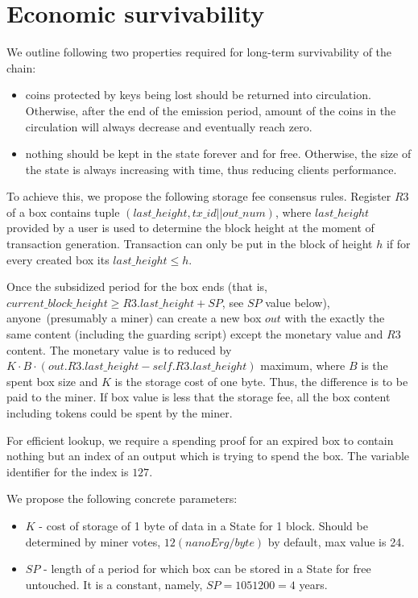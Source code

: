 \section{Economic survivability}

We outline following two properties required for long-term survivability of the chain:

\begin{itemize}
    \item{} coins protected by keys being lost should be returned into circulation.
    Otherwise, after the end of the emission period, amount of the coins
    in the circulation will always decrease and eventually reach zero.
    \item{} nothing should be kept in the state forever and for free.
    Otherwise, the size of the state is always increasing with time, thus reducing clients performance.
\end{itemize}

To achieve this, we propose the following storage fee consensus rules.
Register $R3$ of a box contains tuple $(last\_height, tx\_id || out\_num)$, where $last\_height$ provided by a user
is used to determine the block height at the moment of transaction generation.
Transaction can only be put in the block of height $h$ if for every created box its $last\_height \le h$.

Once the subsidized period for the box ends (that is,
$current\_block\_height \ge R3.last\_height + SP$, see $SP$ value below), anyone~(presumably a miner) can
create a new box $out$ with the exactly the same content (including the guarding
script) except the monetary value and $R3$ content. The monetary value is to
reduced by $K \cdot B \cdot (out.R3.last\_height - self.R3.last\_height)$ maximum, where $B$ is the spent box size and $K$ is the storage cost of one byte.
Thus, the difference is to be paid to the miner.
If box value is less that the storage fee, all the box content including tokens could be spent by the miner.

For efficient lookup, we require a spending proof for an expired box to contain nothing but an index of an
output which is trying to spend the box. The variable identifier for the index is $127$.


We propose the following concrete parameters:
\begin{itemize}
    \item{} $K$ - cost of storage of 1 byte of data in a State for 1 block.
    Should be determined by miner votes, $12 (nanoErg/byte)$ by default, max value is 24.
    \item{} $SP$ - length of a period for which box can be stored in a State for free untouched.
    It is a constant, namely, $SP = 1051200 = 4$ years.
\end{itemize}